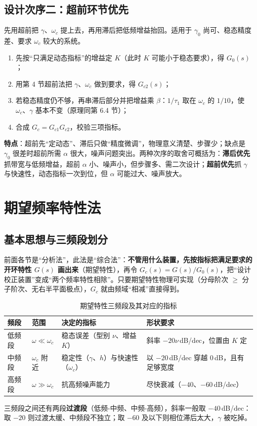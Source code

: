 \subsection{设计次序二：超前环节优先}
先用超前把 $\gamma$、$\omega_c$ 提上去，再用滞后把低频增益抬回。适用于 $\gamma_0$ 尚可、稳态精度差、要求 $\omega_c$ 较大的系统。
\begin{enumerate}
    \item 先按“只满足动态指标”的增益定 $K$（此时 $K$ 可能小于稳态要求），得 $G_0(s)$；
    \item 用第 4 节超前法把 $\gamma$、$\omega_c$ 做到要求，得 $G_{c2}(s)$；
    \item 若稳态精度仍不够，再串滞后部分并把增益乘 $\beta$：$1/\tau_1$ 取在 $\omega_c$ 的 $1/10$，使 $\omega_c$、$\gamma$ 基本不变（原理同第 6.4 节）；
    \item 合成 $G_c=G_{c1}G_{c2}$，校验三项指标。
\end{enumerate}
\textbf{特点}：超前先“定动态”、滞后只做“精度微调”，物理意义清楚、步骤少；缺点是 $\gamma_0$ 很差时超前所需 $\alpha$ 很大，噪声问题突出。两种次序的取舍可概括为：\textbf{滞后优先}抓带宽与低频增益，超前 $\alpha$ 小、噪声小，但步骤多、需二次设计；\textbf{超前优先}抓 $\gamma$ 与快速性，动态指标一次到位，但 $\alpha$ 可能过大、噪声放大。

\bigskip

\section{期望频率特性法}

\subsection{基本思想与三频段划分}
前面各节是“分析法”，此法是“综合法”：\textbf{不管用什么装置，先按指标把满足要求的开环特性 $G(s)$ 画出来}（期望特性），再令 $G_c(s)=G(s)/G_0(s)$，把“设计校正装置”变成“两个频率特性相除”。只要期望特性物理可实现（分母阶次 $\ge$ 分子阶次、无右半平面极点），$G_c$ 就由频域“相减”直接得到。

\begin{table}[htbp]
\centering
\caption{期望特性三频段及其对应的指标}
\begin{tabular}{p{1.6cm}p{3.2cm}p{3.4cm}p{4.6cm}}
\toprule
频段 & 范围 & 决定的指标 & 形状要求 \\
\midrule
低频段 & $\omega\ll\omega_c$ & 稳态误差（型别 $\nu$、增益 $K$） & 斜率 $-20\nu$\,dB/dec，位置由 $K$ 定 \\
中频段 & $\omega_c$ 附近 & 稳定性（$\gamma$、$h$）与快速性（$\omega_c$） & 以 $-20$\,dB/dec 穿越 $0$\,dB，且有足够宽度 \\
高频段 & $\omega\gg\omega_c$ & 抗高频噪声能力 & 尽快衰减（$-40$、$-60$\,dB/dec） \\
\bottomrule
\end{tabular}
\end{table}
三频段之间还有两段\textbf{过渡段}（低频-中频、中频-高频），斜率一般取 $-40$\,dB/dec：取 $-20$ 则过渡太缓、中频段不独立；取 $-60$ 及以下则相位滞后太大，$\gamma$ 被吃掉。

